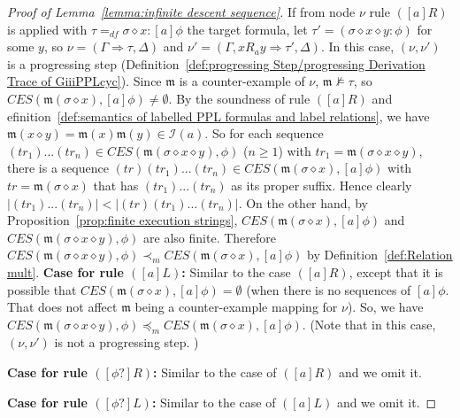 \documentclass[manuscript,screen]{acmart}
\newcommand{\mcl}[1]{\mathcal{#1}}
\newcommand{\mfr}[1]{\mathfrak{#1}}
\newcommand{\dddef}[0]{=_{df}}
\newcommand{\mult}[0]{\preceq_m}
\newcommand{\pmult}[0]{\prec_m}
\newcommand{\lm}[0]{\mfr{m}}
\newcommand{\EX}[0]{\textit{CES}}
\newcommand{\mex}[0]{\textit{mex}}
\newcommand{\cat}[0]{\diamond}
\newcommand{\I}[0]{\mcl{I}}
\begin{document}
\begin{proof}[Proof of Lemma~\ref{lemma:infinite descent sequence}]
    If from node $\nu$ rule $([a]R)$ is applied with $\tau\dddef \sigma\cat x : [a]\phi$ the target formula, 
    let $\tau' = (\sigma\cat x\cat y : \phi)$ for some $y$, so $\nu=(\Gamma\Rightarrow \tau, \Delta)$ and $\nu' = (\Gamma, xR_a y\Rightarrow \tau', \Delta)$. 
    In this case, $(\nu, \nu')$ is a progressing step (Definition~\ref{def:progressing Step/progressing Derivation Trace of GiiiPPLcyc}). 
    Since $\lm$ is a counter-example of $\nu$, $\lm\not\models \tau$, so $\EX(\lm(\sigma\cat x), [a]\phi)\neq \emptyset$. 
    By the soundness of rule $([a]R)$ and efinition~\ref{def:semantics of labelled PPL formulas and label relations}, we have $\lm(x\cat y) = \lm(x)\lm(y)\in \I(a)$. 
So for each sequence $(tr_1)...(tr_n)\in \EX(\lm(\sigma\cat x\cat y), \phi)$ ($n\ge 1$) with $tr_1 = \lm(\sigma\cat x\cat y)$, 
    there is a sequence $(tr)(tr_1)...(tr_n)\in \EX(\lm(\sigma\cat x), [a]\phi)$ with $tr = \lm(\sigma\cat x)$ that has $(tr_1)...(tr_n)$ as its proper suffix. 
    Hence clearly $|(tr_1)...(tr_n)| < |(tr)(tr_1)...(tr_n)|$. 
    On the other hand, by Proposition~\ref{prop:finite execution strings}, %
    $\EX(\lm(\sigma\cat x), [a]\phi)$ and $\EX(\lm(\sigma\cat x\cat y), \phi)$
    are also finite. 
    Therefore $\EX(\lm(\sigma\cat x\cat y), \phi)\pmult \EX(\lm(\sigma\cat x), [a]\phi)$ by Definition~\ref{def:Relation mult}. 
    \fi
\ifx
\textbf{Case for rule $([a]L)$: }
    Similar to the case $([a]R)$, except that it is possible that $\EX(\lm(\sigma\cat x), [a]\phi) = \emptyset$ (when there is no sequences of $[a]\phi$. That does not affect $\lm$ being a counter-example mapping for $\nu$).
    So, we have  $\EX(\lm(\sigma\cat x\cat y), \phi)\mult \EX(\lm(\sigma\cat x), [a]\phi)$. 
    (Note that in this case, $(\nu, \nu')$ is not a progressing step. )

    \textbf{Case for rule $([\phi?]R)$: } Similar to the case of $([a]R)$ and we omit it. 
    
    \textbf{Case for rule $([\phi?]L)$: } Similar to the case of $([a]L)$ and we omit it.
\fi


\end{proof}
\end{document}
